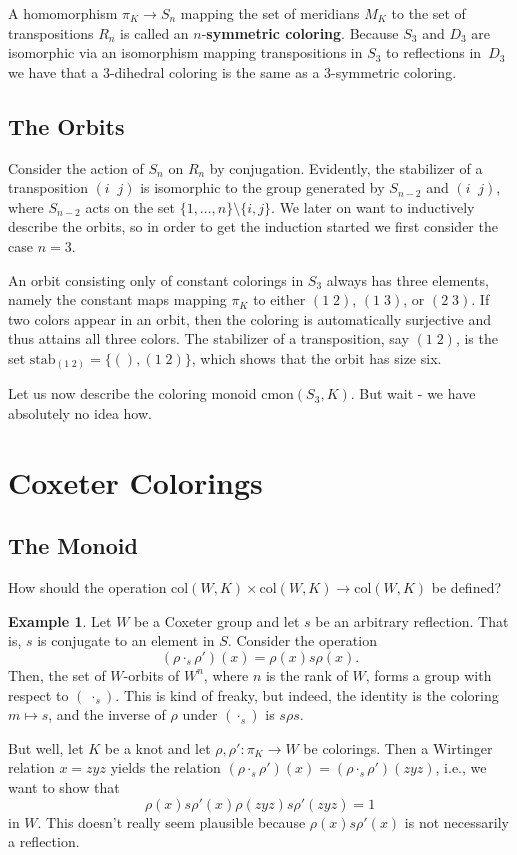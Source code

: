 \documentclass{article}
\theoremstyle{definition}
\newtheorem{example}[theorem]{Example}
\begin{document}
A homomorphism $\pi_K \rightarrow S_n$ mapping the set of meridians $M_K$ to the set of transpositions $R_n$ is called an $n$-\textbf{symmetric coloring}. Because $S_3$ and $D_3$ are isomorphic via an isomorphism mapping transpositions in $S_3$ to reflections in~$D_3$ we have that a $3$-dihedral coloring is the same as a $3$-symmetric coloring.

\subsection{The Orbits}
Consider the action of $S_n$ on $R_n$ by conjugation. Evidently, the stabilizer of a transposition $(i \;\; j)$ is isomorphic to the group generated by $S_{n-2}$ and $(i \;\; j)$, where $S_{n-2}$ acts on the set $\{1, \dots, n\} \setminus \{i,j\}$. We later on want to inductively describe the orbits, so in order to get the induction started we first consider the case $n = 3$.

An orbit consisting only of constant colorings in $S_3$ always has three elements, namely the constant maps mapping $\pi_K$ to either $(1 \; 2)$, $(1 \; 3)$, or $(2 \; 3)$. If two colors appear in an orbit, then the coloring is automatically surjective and thus attains all three colors. The stabilizer of a transposition, say $(1\;2)$, is the set
$\text{stab}_{(1 \; 2)} = \{(), (1\;2)\}$,
which shows that the orbit has size six.


Let us now describe the coloring monoid $\text{cmon}(S_3,K)$. But wait - we have absolutely no idea how.
\section{Coxeter Colorings}
\subsection{The Monoid}
How should the operation $\text{col}(W,K) \times \text{col}(W,K) \rightarrow \text{col}(W,K)$ be defined?

\begin{example}
Let $W$ be a Coxeter group and let $s$ be an arbitrary reflection. That is, $s$ is conjugate to an element in $S$. Consider the operation $$(\rho \cdot_s \rho')(x) = \rho(x) s \rho(x).$$ Then, the set of $W$-orbits of $W^n$, where $n$ is the rank of $W$, forms a group with respect to $(\;\cdot_s)$. This is kind of freaky, but indeed, the identity is the coloring $m \mapsto s$, and the inverse of $\rho$ under $(\cdot_s)$ is $s\rho s$.

But well, let $K$ be a knot and let $\rho, \rho': \pi_K \rightarrow W$ be colorings. Then a Wirtinger relation $x = zyz$ yields the relation $(\rho \cdot_s \rho')(x) = (\rho \cdot_s \rho')(zyz)$, i.e., we want to show that
$$\rho(x)s\rho'(x)\rho(zyz)s\rho'(zyz) = 1$$
in $W$. This doesn't really seem plausible because $\rho(x)s\rho'(x)$ is not necessarily a reflection.
\end{example}
\end{document}
